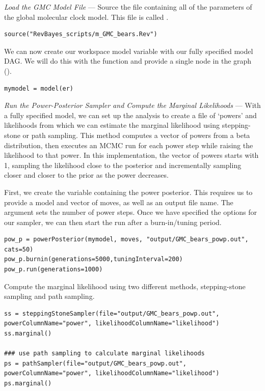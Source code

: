 \textit{Load the GMC Model File} --- Source the file containing all of the parameters of the global molecular clock model. This file is called {\textcolor{red}{}}.

{\tt \begin{snugshade*}
\begin{lstlisting}
source("RevBayes_scripts/m_GMC_bears.Rev")
\end{lstlisting}
\end{snugshade*}}

We can now create our workspace model variable with our fully specified model DAG. 
We will do this with the  function and provide a single node in the graph ().
{\tt \begin{snugshade*}
\begin{lstlisting}
mymodel = model(er)
\end{lstlisting}
\end{snugshade*}}

\textit{Run the Power-Posterior Sampler and Compute the Marginal Likelihoods} --- With a fully specified model, we can set up the  analysis to create a file of `powers' and likelihoods from which we can estimate the marginal likelihood using stepping-stone or path sampling. 
This method computes a vector of powers from a beta distribution, then executes an MCMC run for each power step while raising the likelihood to that power. In this implementation, the vector of powers starts with 1, sampling the likelihood close to the posterior and incrementally sampling closer and closer to the prior as the power decreases. 

First, we create the variable containing the power posterior. This requires us to provide a model and vector of moves, as well as an output file name. The  argument sets the number of power steps.
Once we have specified the options for our sampler, we can then start the run after a burn-in/tuning period.

{\tt \begin{snugshade*}
\begin{lstlisting}
pow_p = powerPosterior(mymodel, moves, "output/GMC_bears_powp.out", cats=50) 
pow_p.burnin(generations=5000,tuningInterval=200)
pow_p.run(generations=1000)  
\end{lstlisting}
\end{snugshade*}}

Compute the marginal likelihood using two different methods, stepping-stone sampling and path sampling. 
{\tt \begin{snugshade*}
\begin{lstlisting}
ss = steppingStoneSampler(file="output/GMC_bears_powp.out", powerColumnName="power", likelihoodColumnName="likelihood")
ss.marginal() 

### use path sampling to calculate marginal likelihoods
ps = pathSampler(file="output/GMC_bears_powp.out", powerColumnName="power", likelihoodColumnName="likelihood")
ps.marginal() 
\end{lstlisting}
\end{snugshade*}}

